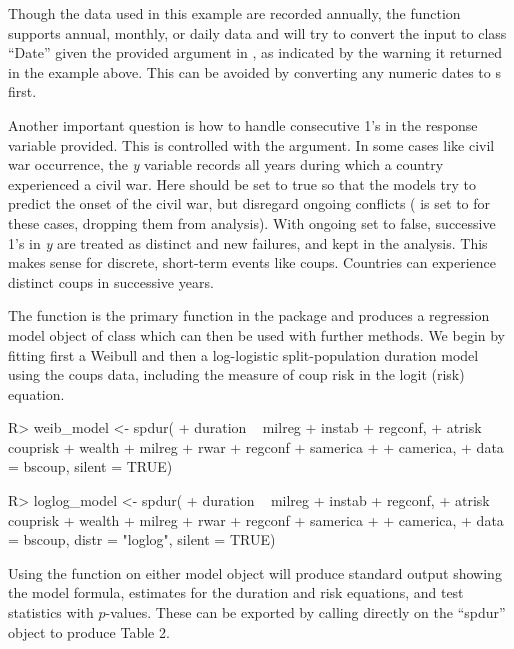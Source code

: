 \documentclass[article]{jss}
\begin{document}
Though the data used in this example are recorded annually, the function
supports annual, monthly, or daily data and will try to convert the
 input to class ``Date'' given the provided argument in
, as indicated by the warning it returned in the example above. This 
can be avoided by converting any numeric dates to  s first.

Another important question is how to handle consecutive 1's
in the response variable provided. This is controlled with the
 argument. In some cases like civil war occurrence, the
\emph{y} variable records all years during which a country experienced a
civil war. Here  should be set to true so that the models
try to predict the onset of the civil war, but disregard ongoing
conflicts ( is set to  for these cases, dropping
them from analysis). With ongoing set to false, successive 1's in
\emph{y} are treated as distinct and new failures, and kept in the
analysis. This makes sense for discrete, short-term events like coups.
Countries can experience distinct coups in successive years.

The  function is the primary function in the package and
produces a regression model object of class  which can then
be used with further methods. We begin by fitting first a Weibull and
then a log-logistic split-population duration model using the coups
data, including the measure of coup risk in the logit (risk) equation.

\begin{CodeChunk}
\begin{CodeInput}
R> weib_model <- spdur(
+    duration ~ milreg + instab + regconf,
+    atrisk ~ couprisk + wealth + milreg + rwar + regconf + samerica + 
+      camerica,
+    data = bscoup, silent = TRUE)

R> loglog_model <- spdur(
+    duration ~ milreg + instab + regconf,
+    atrisk ~ couprisk + wealth + milreg + rwar + regconf + samerica + 
+      camerica,
+    data = bscoup, distr = "loglog", silent = TRUE)
\end{CodeInput}
\end{CodeChunk}

Using the  function on either model object will produce
standard output showing the model formula, estimates for the duration
and risk equations, and test statistics with \(p\)-values. These can be
exported by calling \citep[see][]{dahl2016xtable} directly on the ``spdur'' object to
produce Table 2.
\end{document}
